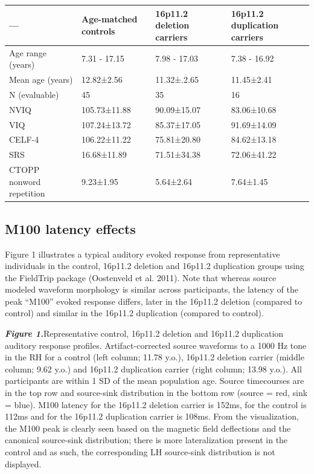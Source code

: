 \documentclass[]{article}
\begin{document}
\begin{longtable}[c]{@{}llll@{}}
\toprule
--- & Age-matched controls & 16p11.2 deletion carriers & 16p11.2
duplication carriers\tabularnewline
\midrule
\endhead
Age range (years) & 7.31 - 17.15 & 7.98 - 17.03 & 7.38 -
16.92\tabularnewline
Mean age (years) & 12.82±2.56 & 11.32±.2.65 & 11.45±2.41\tabularnewline
N (evaluable) & 45 & 35 & 16\tabularnewline
NVIQ & 105.73±11.88 & 90.09±15.07 & 83.06±10.68\tabularnewline
VIQ & 107.24±13.72 & 85.37±17.05 & 91.69±14.09\tabularnewline
CELF-4 & 106.22±11.22 & 75.81±20.80 & 84.62±13.18\tabularnewline
SRS & 16.68±11.89 & 71.51±34.38 & 72.06±41.22\tabularnewline
CTOPP nonword repetition & 9.23±1.95 & 5.64±2.64 &
7.64±1.45\tabularnewline
\bottomrule
\end{longtable}

\medskip

\subsection{M100 latency effects}\label{m100-latency-effects}

Figure 1 illustrates a typical auditory evoked response from
representative individuals in the control, 16p11.2 deletion and 16p11.2
duplication groups using the FieldTrip package (Oostenveld et al. 2011).
Note that whereas source modeled waveform morphology is similar across
participants, the latency of the peak ``M100'' evoked response differs,
later in the 16p11.2 deletion (compared to control) and similar in the
16p11.2 duplication (compared to control).

\medskip

\textbf{\emph{Figure 1.}}Representative control, 16p11.2 deletion and
16p11.2 duplication auditory response profiles. Artifact-corrected
source waveforms to a 1000 Hz tone in the RH for a control (left column;
11.78 y.o.), 16p11.2 deletion carrier (middle column; 9.62 y.o.) and
16p11.2 duplication carrier (right column; 13.98 y.o.). All participants
are within 1 SD of the mean population age. Source timecourses are in
the top row and source-sink distribution in the bottom row (source =
red, sink = blue). M100 latency for the 16p11.2 deletion carrier is
152ms, for the control is 112ms and for the 16p11.2 duplication carrier
is 108ms. From the visualization, the M100 peak is clearly seen based on
the magnetic field deflections and the canonical source-sink
distribution; there is more lateralization present in the control and as
such, the corresponding LH source-sink distribution is not displayed.
\end{document}
